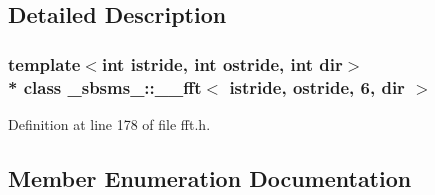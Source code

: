 \subsection{Detailed Description}
\subsubsection*{template$<$int istride, int ostride, int dir$>$\\*
class \+\_\+sbsms\+\_\+\+::\+\_\+\+\_\+fft$<$ istride, ostride, 6, dir $>$}



Definition at line 178 of file fft.\+h.



\subsection{Member Enumeration Documentation}
